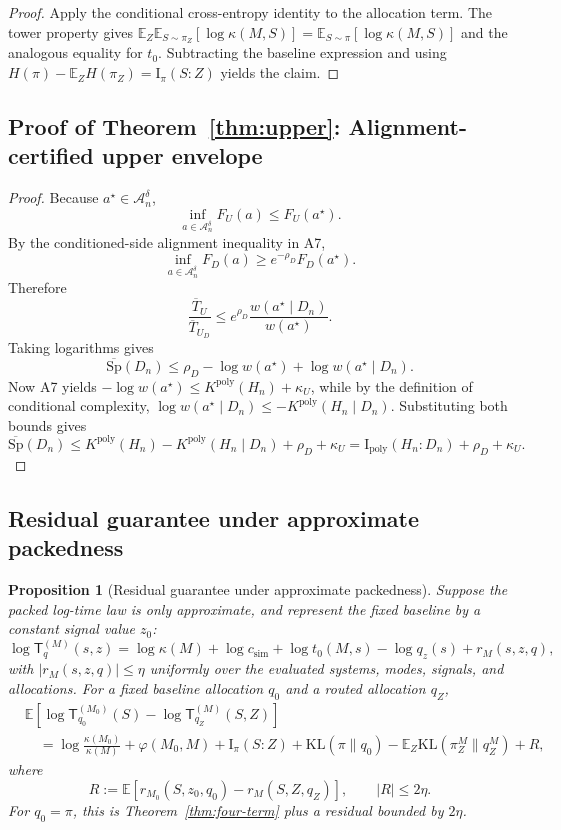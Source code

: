 \documentclass[10pt]{article}
\theoremstyle{paperplain}
\newtheorem{proposition}[theorem]{Proposition}
\theoremstyle{paperdefinition}
\theoremstyle{paperremark}
\newcommand{\poly}{\mathrm{poly}}
\newcommand{\KL}{\mathrm{KL}}
\newcommand{\I}{\mathrm{I}}
\newcommand{\E}{\mathbb{E}}
\newcommand{\cA}{\mathcal{A}}
\newcommand{\Sp}{\mathrm{Sp}}
\begin{document}
\begin{proof}
Apply the conditional cross-entropy identity to the allocation term. The tower property gives
$\E_Z\E_{S\sim\pi_Z}[\log\kappa(M,S)]=\E_{S\sim\pi}[\log\kappa(M,S)]$
and the analogous equality for $t_0$. Subtracting the baseline expression and using
$H(\pi)-\E_ZH(\pi_Z)=\I_\pi(S:Z)$ yields the claim.
\end{proof}

\subsection{Proof of Theorem~\ref{thm:upper}: Alignment-certified upper envelope}
\label{app:proof:thm:upper}

\begin{proof}
Because $a^\star\in\cA_n^\delta$,
\[
\inf_{a\in\cA_n^\delta}F_U(a)\le F_U(a^\star).
\]
By the conditioned-side alignment inequality in A7,
\[
\inf_{a\in\cA_n^\delta}F_D(a)\ge e^{-\rho_D}F_D(a^\star).
\]
Therefore
\[
\frac{\overline T_U}{\overline T_{U_D}}
\le
e^{\rho_D}\frac{w(a^\star\mid D_n)}{w(a^\star)}.
\]
Taking logarithms gives
\[
\overline{\Sp}(D_n)
\le
\rho_D-\log w(a^\star)+\log w(a^\star\mid D_n).
\]
Now A7 yields
$-\log w(a^\star)\le K^{\poly}(H_n)+\kappa_U$,
while by the definition of conditional complexity,
$\log w(a^\star\mid D_n)\le -K^{\poly}(H_n\mid D_n)$.
Substituting both bounds gives
\[
\overline{\Sp}(D_n)
\le
K^{\poly}(H_n)-K^{\poly}(H_n\mid D_n)+\rho_D+\kappa_U
=
\I_{\mathrm{poly}}(H_n:D_n)+\rho_D+\kappa_U.
\]
\end{proof}

\subsection{Residual guarantee under approximate packedness}
\label{app:proof:prop:approximation-guarantee}

\begin{proposition}[Residual guarantee under approximate packedness]
\label{prop:approximation-guarantee}
Suppose the packed log-time law is only approximate, and represent the fixed baseline by a constant signal value $z_0$:
\[
\log \mathsf{T}_{q}^{(M)}(s,z)
=\log\kappa(M)+\log c_{\mathrm{sim}}+\log t_0(M,s)-\log q_z(s)
+r_M(s,z,q),
\]
with $|r_M(s,z,q)|\le\eta$ uniformly over the evaluated systems, modes, signals, and allocations.
For a fixed baseline allocation $q_0$ and a routed allocation $q_Z$,
\[
\begin{aligned}
&\E\!\left[\log \mathsf{T}_{q_0}^{(M_0)}(S)-\log \mathsf{T}_{q_Z}^{(M)}(S,Z)\right]\\
&\quad=
\log\frac{\kappa(M_0)}{\kappa(M)}
+\varphi(M_0,M)+\I_\pi(S:Z)
+\KL(\pi\|q_0)-\E_Z\KL(\pi_Z^M\|q_Z^M)+R,
\end{aligned}
\]
where
\[
R:=\E[r_{M_0}(S,z_0,q_0)-r_M(S,Z,q_Z)],
\qquad |R|\le 2\eta.
\]
For $q_0=\pi$, this is Theorem~\ref{thm:four-term} plus a residual bounded by $2\eta$.
\end{proposition}
\end{document}
